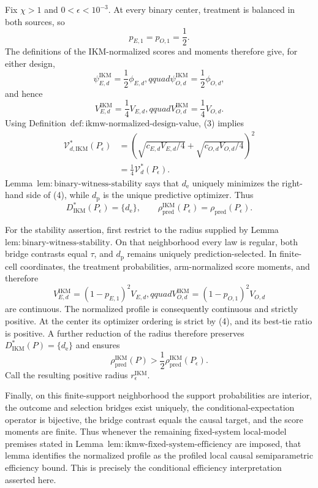 Fix \(\chi>1\) and \(0<\epsilon<10^{-3}\).  At every binary center, treatment is balanced in both sources, so
\[
 p_{E,1}=p_{O,1}=\frac12.                              \tag{1}
\]
The definitions of the IKM-normalized scores and moments therefore give, for either design,
\[
 \psi_{E,d}^{\mathrm{IKM}}=\frac12\phi_{E,d},qquad
 \psi_{O,d}^{\mathrm{IKM}}=\frac12\phi_{O,d},          \tag{2}
\]
and hence
\[
 V_{E,d}^{\mathrm{IKM}}=\frac14V_{E,d},qquad
 V_{O,d}^{\mathrm{IKM}}=\frac14V_{O,d}.                \tag{3}
\]
Using Definition~\(\mathrm{def{:}ikmw\text{-}normalized\text{-}design\text{-}value}\), (3) implies
\[
\begin{aligned}
 \mathcal V_{d,\mathrm{IKM}}^*(P_\epsilon)
 &=\left(
 \sqrt{c_{E,d}V_{E,d}/4}+
 \sqrt{c_{O,d}V_{O,d}/4}
 \right)^2\\
 &=\frac14\mathcal V_d^*(P_\epsilon).                 \tag{4}
\end{aligned}
\]
Lemma~\(\mathrm{lem{:}binary\text{-}witness\text{-}stability}\) says that \(d_{\mathrm e}\) uniquely minimizes the right-hand side of (4), while \(d_{\mathrm p}\) is the unique predictive optimizer.  Thus
\[
 D_{\mathrm{IKM}}^*(P_\epsilon)=\{d_{\mathrm e}\},
 \qquad
 \rho_{\mathrm{pred}}^{\mathrm{IKM}}(P_\epsilon)
 =\rho_{\mathrm{pred}}(P_\epsilon).                   \tag{5}
\]

For the stability assertion, first restrict to the radius supplied by Lemma~\(\mathrm{lem{:}binary\text{-}witness\text{-}stability}\).  On that neighborhood every law is regular, both bridge contrasts equal \(\tau\), and \(d_{\mathrm p}\) remains uniquely prediction-selected.  In finite-cell coordinates, the treatment probabilities, arm-normalized score moments, and therefore
\[
 V_{E,d}^{\mathrm{IKM}}=(1-p_{E,1})^2V_{E,d},qquad
 V_{O,d}^{\mathrm{IKM}}=(1-p_{O,1})^2V_{O,d}            \tag{6}
\]
are continuous.  The normalized profile is consequently continuous and strictly positive.  At the center its optimizer ordering is strict by (4), and its best-tie ratio is positive.  A further reduction of the radius therefore preserves
\(D_{\mathrm{IKM}}^*(P)=\{d_{\mathrm e}\}\) and ensures
\[
 \rho_{\mathrm{pred}}^{\mathrm{IKM}}(P)
 >\frac12\rho_{\mathrm{pred}}^{\mathrm{IKM}}(P_\epsilon).       \tag{7}
\]
Call the resulting positive radius \(r_\epsilon^{\mathrm{IKM}}\).

Finally, on this finite-support neighborhood the support probabilities are interior, the outcome and selection bridges exist uniquely, the conditional-expectation operator is bijective, the bridge contrast equals the causal target, and the score moments are finite.  Thus whenever the remaining fixed-system local-model premises stated in Lemma~\(\mathrm{lem{:}ikmw\text{-}fixed\text{-}system\text{-}efficiency}\) are imposed, that lemma identifies the normalized profile as the profiled local causal semiparametric efficiency bound.  This is precisely the conditional efficiency interpretation asserted here.